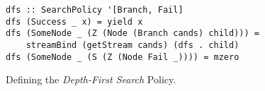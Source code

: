 \begin{wrapfigure}{l}{0.63\textwidth}
\vspace{-0.25cm}
\begin{ccodebox}
\begin{lstlisting}[style=haskell]
dfs :: SearchPolicy '[Branch, Fail]
dfs (Success _ x) = yield x
dfs (SomeNode _ (Z (Node (Branch cands) child))) =
    streamBind (getStream cands) (dfs . child)
dfs (SomeNode _ (S (Z (Node Fail _)))) = mzero
\end{lstlisting}
\end{ccodebox}
\vspace{-0.3cm}
\caption{Defining the \emph{Depth-First Search} Policy.}\label{fig:dfs}
\end{wrapfigure}
